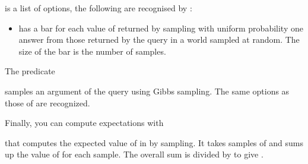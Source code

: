 \documentclass[letterpaper,10pt,english]{sphinxmanual}
\begin{document}
\sphinxAtStartPar
{} is a list of options, the following are recognised by :
\begin{itemize}
\item {} 
\sphinxAtStartPar
{}  has a bar for each value of  returned by sampling with uniform probability one answer from those returned by the query in a world sampled at random. The size of the bar is the number of samples.

\end{itemize}

\sphinxAtStartPar
The predicate

\begin{sphinxVerbatim}[commandchars=\\\{\}]
  
\end{sphinxVerbatim}

\sphinxAtStartPar
samples an argument of the query using Gibbs sampling.
The same options as those of  are recognized.

\sphinxAtStartPar
Finally, you can compute expectations with

\begin{sphinxVerbatim}[commandchars=\\\{\}]
  
\end{sphinxVerbatim}

\sphinxAtStartPar
that computes the expected value of  in  by sampling.
It takes  samples of  and sums up the value of  for each sample.
The overall sum is divided by  to give .
\end{document}
